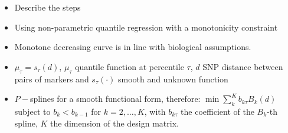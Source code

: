 \documentclass[a0paper,portrait]{baposter}
\begin{document}
\begin{poster}
{\begin{minipage}{0.3 \textwidth}
\begin{itemize}[leftmargin=*]
\item Describe the steps
\end{itemize}
\end{minipage}
}%

 {%
\begin{itemize}[leftmargin=*]
	\item Using non-parametric quantile 
	regression with a monotonicity constraint \citep{Muggeo2013,BollaertsEtAl2006StatMod}
	\item Monotone decreasing curve is in line with biological assumptions.
	\item $\mu_{\tau}=s_{\tau}(d)$, $\mu_\tau$ quantile function at 
	percentile $\tau$, $d$ SNP distance between pairs of markers and 
	$s_{\tau}(\cdot)$ smooth and unknown function
	\item  $P-$splines for a smooth functional form, therefore: \newline 
$\min\sum_k^K b_{k\tau} B_k(d)$ subject to $b_k<b_{k-1}$ for $k=2,\ldots,K$, with $b_{k\tau}$
	the coefficient of the $B_k$-th spline, $K$ the dimension of the design matrix.
%	
%
\end{itemize}
}



\end{poster}
\end{document}
